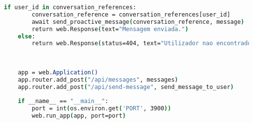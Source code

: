 \begin{lstlisting}[language=csh, caption={Envio de notificação via Microsoft Teams}]
    if user_id in conversation_references:
        conversation_reference = conversation_references[user_id]
        await send_proactive_message(conversation_reference, message)
        return web.Response(text="Mensagem enviada.")
    else:
        return web.Response(status=404, text="Utilizador nao encontrado.")
    
    
    
    app = web.Application()
    app.router.add_post("/api/messages", messages)
    app.router.add_post("/api/send-message", send_message_to_user)
    
    if __name__ == "__main__":
        port = int(os.environ.get('PORT', 3900))
        web.run_app(app, port=port)
    
    \end{lstlisting}